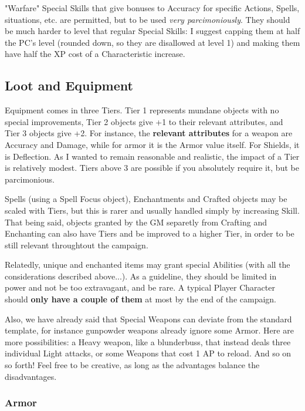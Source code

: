 "Warfare" Special Skills that give bonuses to Accuracy for specific Actions, Spells, situations, etc. are permitted, but to be used \textit{very parcimoniously}. They should be much harder to level that regular Special Skills: I suggest capping them at half the PC's level (rounded down, so they are disallowed at level 1) and making them have half the XP cost of a Characteristic increase.

\subsection{Loot and Equipment}

\label{balancing_equipment}

Equipment comes in three Tiers. Tier 1 represents mundane objects with no special improvements, Tier 2 objects give +1 to their relevant attributes, and Tier 3 objects give +2. For instance, the \textbf{relevant attributes} for a weapon are Accuracy and Damage, while for armor it is the Armor value itself. For Shields, it is Deflection. As I wanted to remain reasonable and realistic, the impact of a Tier is relatively modest. Tiers above 3 are possible if you absolutely require it, but be parcimonious.

Spells (using a Spell Focus object), Enchantments and Crafted objects may be scaled with Tiers, but this is rarer and usually handled simply by increasing Skill. That being said, objects granted by the GM separetly from Crafting and Enchanting can also have Tiers and be improved to a higher Tier, in order to be still relevant throughtout the campaign.

Relatedly, unique and enchanted items may grant special Abilities (with all the considerations described above...). As a guideline, they should be limited in power and not be too extravagant, and be rare. A typical Player Character should \textbf{only have a couple of them} at most by the end of the campaign.

Also, we have already said that Special Weapons can deviate from the standard template, for instance gunpowder weapons already ignore some Armor. Here are more possibilities: a Heavy weapon, like a blunderbuss, that instead deals three individual Light attacks, or some Weapons that cost 1 AP to reload. And so on so forth! Feel free to be creative, as long as the advantages balance the disadvantages.


\subsubsection{Armor}

